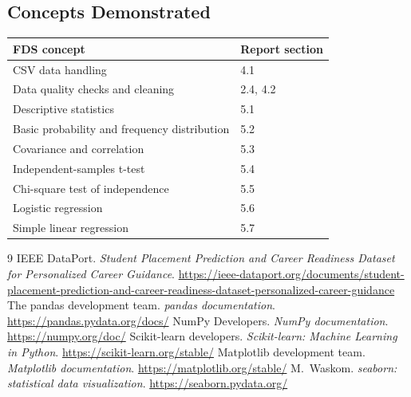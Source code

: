 \documentclass[12pt,a4paper]{article}
\begin{document}
\subsection*{Concepts Demonstrated}
\begin{table}[H]
\centering
\begin{tabular}{ll}
\toprule
\textbf{FDS concept} & \textbf{Report section} \\
\midrule
CSV data handling & 4.1 \\
Data quality checks and cleaning & 2.4, 4.2 \\
Descriptive statistics & 5.1 \\
Basic probability and frequency distribution & 5.2 \\
Covariance and correlation & 5.3 \\
Independent-samples t-test & 5.4 \\
Chi-square test of independence & 5.5 \\
Logistic regression & 5.6 \\
Simple linear regression & 5.7 \\
\bottomrule
\end{tabular}
\end{table}

\begin{thebibliography}{9}
 IEEE DataPort. \emph{Student Placement Prediction and Career Readiness Dataset for Personalized Career Guidance}. \url{https://ieee-dataport.org/documents/student-placement-prediction-and-career-readiness-dataset-personalized-career-guidance}
 The pandas development team. \emph{pandas documentation}. \url{https://pandas.pydata.org/docs/}
 NumPy Developers. \emph{NumPy documentation}. \url{https://numpy.org/doc/}
 Scikit-learn developers. \emph{Scikit-learn: Machine Learning in Python}. \url{https://scikit-learn.org/stable/}
 Matplotlib development team. \emph{Matplotlib documentation}. \url{https://matplotlib.org/stable/}
 M.\ Waskom. \emph{seaborn: statistical data visualization}. \url{https://seaborn.pydata.org/}
\end{thebibliography}
\end{document}
